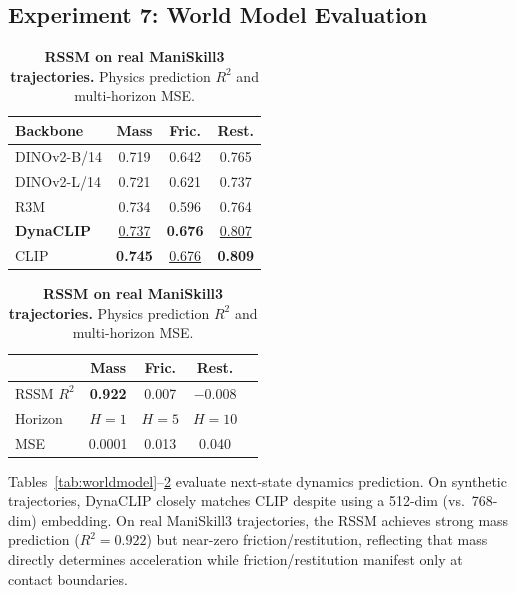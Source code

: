 \documentclass{article}
\newcommand{\methodname}{DynaCLIP}
\newcommand{\best}[1]{\textbf{#1}}
\newcommand{\second}[1]{\underline{#1}}
\begin{document}
\subsection{Experiment 7: World Model Evaluation}
\label{sec:exp_worldmodel}

\begin{table}[t]
\centering
\begin{minipage}{0.48\textwidth}
\centering
\caption{\textbf{RSSM world model (synthetic).} Best validation $R^2$ on next-state physics prediction.}
\label{tab:worldmodel}
\small
\begin{tabular}{@{}lccc@{}}
\toprule
\textbf{Backbone} & \textbf{Mass} & \textbf{Fric.} & \textbf{Rest.} \\
\midrule
DINOv2-B/14 & 0.719 & 0.642 & 0.765 \\
DINOv2-L/14 & 0.721 & 0.621 & 0.737 \\
R3M & 0.734 & 0.596 & 0.764 \\
\textbf{\methodname{}} & \second{0.737} & \best{0.676} & \second{0.807} \\
CLIP & \best{0.745} & \second{0.676} & \best{0.809} \\
\bottomrule
\end{tabular}
\end{minipage}
\hfill
\begin{minipage}{0.48\textwidth}
\centering
\caption{\textbf{RSSM on real ManiSkill3 trajectories.} Physics prediction $R^2$ and multi-horizon MSE.}
\label{tab:worldmodel_real}
\small
\begin{tabular}{@{}lcccc@{}}
\toprule
& Mass & Fric. & Rest. \\
\midrule
RSSM $R^2$ & \best{0.922} & 0.007 & $-$0.008 \\
\midrule
Horizon & $H{=}1$ & $H{=}5$ & $H{=}10$ \\
\midrule
MSE & 0.0001 & 0.013 & 0.040 \\
\bottomrule
\end{tabular}
\end{minipage}
\end{table}

Tables~\ref{tab:worldmodel}--\ref{tab:worldmodel_real} evaluate next-state dynamics prediction. On synthetic trajectories, \methodname{} closely matches CLIP despite using a 512-dim (vs.\ 768-dim) embedding. On real ManiSkill3 trajectories, the RSSM achieves strong mass prediction ($R^2{=}0.922$) but near-zero friction/restitution, reflecting that mass directly determines acceleration while friction/restitution manifest only at contact boundaries.
\end{document}
